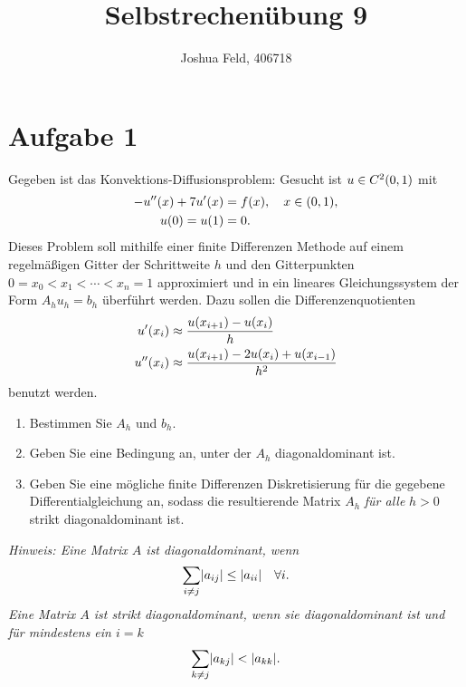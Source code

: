\documentclass{exercise}
\institute{Applied and Computational Mathematics}
\title{Selbstrechenübung 9}
\author{Joshua Feld, 406718}
\begin{document}
    \maketitle


    \section*{Aufgabe 1}
    
    \begin{problem}
        Gegeben ist das Konvektions-Diffusionsproblem: Gesucht ist \(u \in C^2\parentheses*{0, 1}\) mit
        \begin{align*}
            -u''\parentheses*{x} + 7u'\parentheses*{x} &= f\parentheses*{x}, \quad x \in \parentheses*{0, 1},\\
            u\parentheses*{0} = u\parentheses*{1} &= 0.
        \end{align*}
        Dieses Problem soll mithilfe einer finite Differenzen Methode auf einem regelmäßigen Gitter der Schrittweite \(h\) und den Gitterpunkten \(0 = x_0 < x_1 < \cdots < x_n = 1\) approximiert und in ein lineares Gleichungssystem der Form \(A_h u_h = b_h\) überführt werden.
        Dazu sollen die Differenzenquotienten
        \begin{align*}
            u'\parentheses*{x_i} &\approx \frac{u\parentheses*{x_{i + 1}} - u\parentheses*{x_i}}{h}\\
            u''\parentheses*{x_i} &\approx \frac{u\parentheses*{x_{i + 1}} - 2u\parentheses*{x_i} + u\parentheses*{x_{i - 1}}}{h^2}
        \end{align*}
        benutzt werden.
        \begin{enumerate}
            \item Bestimmen Sie \(A_h\) und \(b_h\).
            \item Geben Sie eine Bedingung an, unter der \(A_h\) diagonaldominant ist.
            \item Geben Sie eine mögliche finite Differenzen Diskretisierung für die gegebene Differentialgleichung an, sodass die resultierende Matrix \(A_h\) \emph{für alle} \(h > 0\) strikt diagonaldominant ist.
        \end{enumerate}
        \emph{Hinweis: Eine Matrix \(A\) ist diagonaldominant, wenn
        \[
            \sum_{i \ne j}\absolute*{a_{ij}} \le \absolute*{a_{ii}} \quad \forall i.
        \]
        Eine Matrix \(A\) ist strikt diagonaldominant, wenn sie diagonaldominant ist und für mindestens ein \(i = k\)
        \[
            \sum_{k \ne j}\absolute*{a_{kj}} < \absolute*{a_{kk}}.
        \]}
    \end{problem}
    
\end{document}
